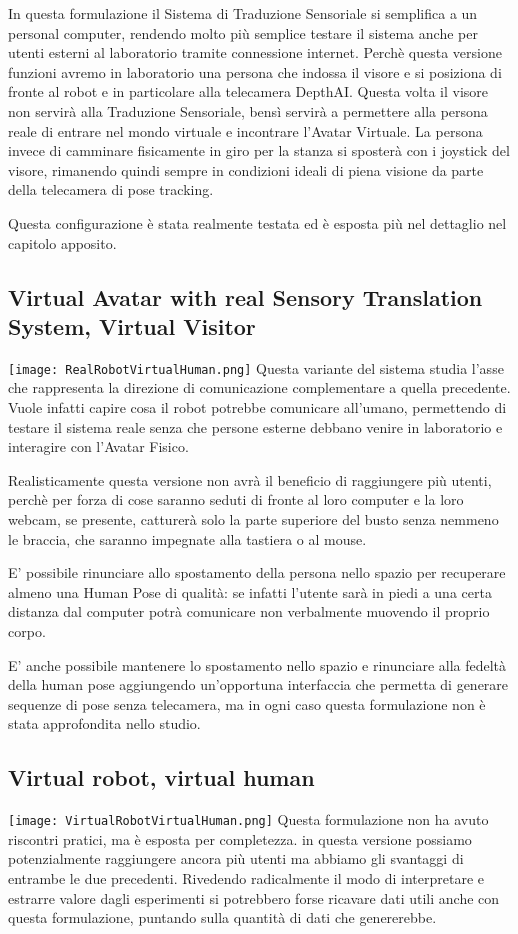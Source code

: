 \documentclass{Configuration_Files/PoliMi3i_thesis}
\begin{document}
In questa formulazione il Sistema di Traduzione Sensoriale si semplifica a un personal computer, rendendo molto più semplice testare il sistema anche per utenti esterni al laboratorio tramite connessione internet. Perchè questa versione funzioni avremo in laboratorio una persona che indossa il visore e si posiziona di fronte al robot e in particolare alla telecamera DepthAI. Questa volta il visore non servirà alla Traduzione Sensoriale, bensì servirà a permettere alla persona reale di entrare nel mondo virtuale e incontrare l'Avatar Virtuale. La persona invece di camminare fisicamente in giro per la stanza si sposterà con i joystick del visore, rimanendo quindi sempre in condizioni ideali di piena visione da parte della telecamera di pose tracking.

Questa configurazione è stata realmente testata ed è esposta più nel dettaglio nel capitolo apposito.

\subsection{Virtual Avatar with real Sensory Translation System, Virtual Visitor}
\texttt{[image: RealRobotVirtualHuman.png]}
Questa variante del sistema studia l’asse che rappresenta la direzione di comunicazione complementare a quella precedente. Vuole infatti capire cosa il robot potrebbe comunicare all’umano, permettendo di testare il sistema reale senza che persone esterne debbano venire in laboratorio e interagire con l'Avatar Fisico.

Realisticamente questa versione non avrà il beneficio di raggiungere più utenti, perchè per forza di cose saranno seduti di fronte al loro computer e la loro webcam, se presente, catturerà solo la parte superiore del busto senza nemmeno le braccia, che saranno impegnate alla tastiera o al mouse.

E’ possibile rinunciare allo spostamento della persona nello spazio per recuperare almeno una Human Pose di qualità: se infatti l’utente sarà in piedi a una certa distanza dal computer potrà comunicare non verbalmente muovendo il proprio corpo.

E’ anche possibile mantenere lo spostamento nello spazio e rinunciare alla fedeltà della human pose aggiungendo un’opportuna interfaccia che permetta di generare sequenze di pose senza telecamera, ma in ogni caso questa formulazione non è stata approfondita nello studio.

\subsection{Virtual robot, virtual human}
\texttt{[image: VirtualRobotVirtualHuman.png]}
Questa formulazione non ha avuto riscontri pratici, ma è esposta per completezza. in questa versione possiamo potenzialmente raggiungere ancora più utenti ma abbiamo gli svantaggi di entrambe le due precedenti. Rivedendo radicalmente il modo di interpretare e estrarre valore dagli esperimenti si potrebbero forse ricavare dati utili anche con questa formulazione, puntando sulla quantità di dati che genererebbe.
\end{document}

